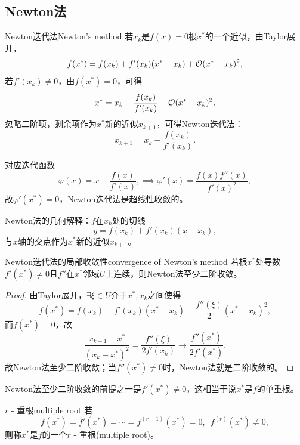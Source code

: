 \subsection{Newton法}

\begin{theorem}
    {Newton迭代法}{Newton's method}
    若$x_k$是$f(x)=0$根$x^*$的一个近似，由Taylor展开，
    \[
        f(x^*)=f(x_k)+f'(x_k)(x^*-x_k)+\mathcal O(x^*-x_k)^2,
    \]
    若$f'(x_k)\neq 0$，由$f(x^*)=0$，可得 
    \[
        x^*=x_k-\frac{f(x_k)}{f'(x_k)}+\mathcal O(x^*-x_k)^2,
    \]
    忽略二阶项，剩余项作为$x^*$新的近似$x_{k+1}$，可得Newton迭代法：
    \begin{equation}
        \label{eqn:Newton iter}
        x_{k+1}=x_k-\frac{f(x_k)}{f'(x_k)}.
    \end{equation}
\end{theorem}

\begin{corollary}
    对应迭代函数
    \[
        \varphi(x)=x-\frac{f(x)}{f'(x)},\implies\varphi'(x)=\frac{f(x)f''(x)}{f'(x)^2},
    \]
    故$\varphi'(x^*)=0$，Newton迭代法是超线性收敛的。
\end{corollary}

\begin{remark}
    Newton法的几何解释：$f$在$x_k$处的切线
    \[
        y=f(x_k)+f'(x_k)(x-x_k),
    \]
    与$x$轴的交点作为$x^*$新的近似$x_{k+1}$。
\end{remark}

\begin{theorem}
    {Newton迭代法的局部收敛性}{convergence of Newton's method}
    若根$x^*$处导数$f'(x^*)\neq 0$且$f''$在$x^*$邻域$U$上连续，则Newton法至少二阶收敛。
\end{theorem}

\begin{proof}
    由Taylor展开，$\exists\xi\in U$介于$x^*,x_k$之间使得
    \[
        f(x^*)=f(x_k)+f'(x_k)(x^*-x_k)+\frac{f''(\xi)}2(x^*-x_k)^2,
    \]
    而$f(x^*)=0$，故
    \[
        \frac{x_{k+1}-x^*}{(x_k-x^*)^2}=\frac{f''(\xi)}{2f'(x_k)}\to\frac{f''(x^*)}{2f'(x^*)}.
    \]
    故Newton法至少二阶收敛；当$f''(x^*)\neq 0$时，Newton法就是二阶收敛的。
\end{proof}

\begin{remark}
    Newton法至少二阶收敛的前提之一是$f'(x^*)\neq 0$，这相当于说$x^*$是$f$的单重根。
\end{remark}

\begin{definition}
    {$r$ - 重根}{multiple root}
    若
    \[
        f(x^*)=f'(x^*)=\cdots=f^{(r-1)}(x^*)=0,\enspace f^{(r)}(x^*)\neq 0,
    \]
    则称$x^*$是$f$的一个$r$ - 重根(multiple root)。
\end{definition}

